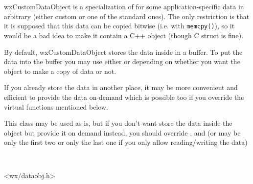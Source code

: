 \section{}\label{wxcustomdataobject}

wxCustomDataObject is a specialization of 
 for some
application-specific data in arbitrary (either custom or one of the standard
ones). The only restriction is that it is supposed that this data can be
copied bitwise (i.e. with {\tt memcpy()}), so it would be a bad idea to make
it contain a C++ object (though C struct is fine).

By default, wxCustomDataObject stores the data inside in a buffer. To put the
data into the buffer you may use either 
 or 
 depending on whether you want
the object to make a copy of data or not.

If you already store the data in another place, it may be more convenient and
efficient to provide the data on-demand which is possible too if you override
the virtual functions mentioned below.


This class may be used as is, but if you don't want store the data inside the
object but provide it on demand instead, you should override 
, 
 and 
 (or may be only the first two or
only the last one if you only allow reading/writing the data)


\\


<wx/dataobj.h>






\label{wxcustomdataobjectwxcustomdataobject}

